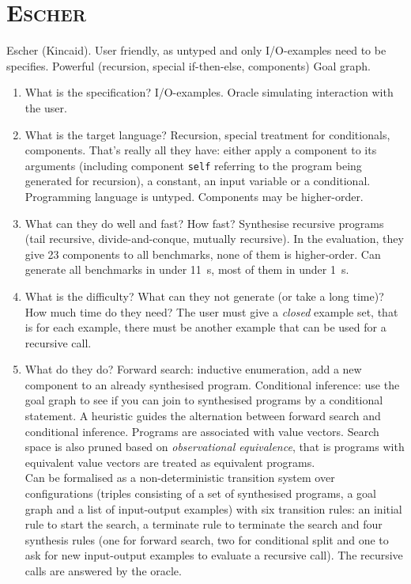 \section{\textsc{Escher}}
Escher (Kincaid). User friendly, as untyped and only I/O-examples need to be specifies. Powerful (recursion, special if-then-else, components) Goal graph.
\begin{enumerate}
\item What is the specification?
I/O-examples. Oracle simulating interaction with the user.
\item What is the target language?
Recursion, special treatment for conditionals, components. That's really all they have: either apply a component to its arguments (including component \lstinline?self? referring to the program being generated for recursion), a constant, an input variable or a conditional. Programming language is untyped. Components may be higher-order.
\item What can they do well and fast? How fast?
Synthesise recursive programs (tail recursive, divide-and-conque, mutually recursive). In the evaluation, they give 23 components to all benchmarks, none of them is higher-order. Can generate all benchmarks in under 11~s, most of them in under 1~s.
\item What is the difficulty? What can they not generate (or take a long time)? How much time do they need?
The user must give a \emph{closed} example set, that is for each example, there must be another example that can be used for a recursive call.
\item What do they do?
Forward search: inductive enumeration, add a new component to an already synthesised program.
Conditional inference: use the goal graph to see if you can join to synthesised programs by a conditional statement.
A heuristic guides the alternation between forward search and conditional inference.
Programs are associated with value vectors. Search space is also pruned based on \emph{observational equivalence}, that is programs with equivalent value vectors are treated as equivalent programs.\\
Can be formalised as a non-deterministic transition system over configurations (triples consisting of a set of synthesised programs, a goal graph and a list of input-output examples) with six transition rules: an initial rule to start the search, a terminate rule to terminate the search and four synthesis rules (one for forward search, two for conditional split and one to ask for new input-output examples to evaluate a recursive call). The recursive calls are answered by the oracle.\\

\end{enumerate}
